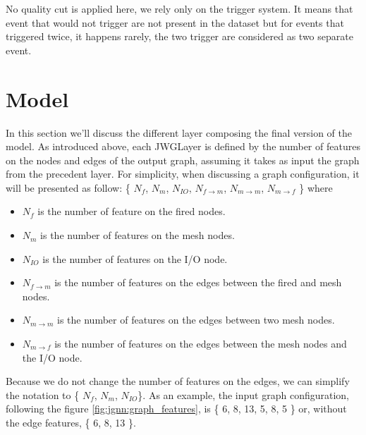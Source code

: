 \documentclass[../main.tex]{subfiles}
\begin{document}
No quality cut is applied here, we rely only on the trigger system. It means that event that would not trigger are not present in the dataset but for events that triggered twice, it happens rarely, the two trigger are considered as two separate event.



\section{Model}

In this section we'll discuss the different layer composing the final version of the model. As introduced above, each JWGLayer is defined by the number of features on the nodes and edges of the output graph, assuming it takes as input the graph from the precedent layer. For simplicity, when discussing a graph configuration, it will be presented as follow: \{ {\color{red} $N_{f}$},  {\color{Dandelion} $N_{m}$}, {\color{blue} $N_{IO}$}, $N_{f\rightarrow m}$, $N_{m \rightarrow m}$, $N_{m \rightarrow f}$ \} where
\begin{itemize}
  \item {\color{red} $N_{f}$} is the number of feature on the fired nodes.
  \item {\color{Dandelion} $N_{m}$} is the number of features on the mesh nodes.
  \item {\color{blue} $N_{IO}$} is the number of features on the I/O node.
  \item $N_{f\rightarrow m}$ is the number of features on the edges between the fired and mesh nodes.
  \item $N_{m \rightarrow m}$ is the number of features on the edges between two mesh nodes.
  \item $N_{m \rightarrow f}$ is the number of features on the edges between the mesh nodes and the I/O node.
\end{itemize}

Because we do not change the number of features on the edges, we can simplify the notation to \{{\color{red} $N_{f}$}, {\color{Dandelion} $N_{m}$}, {\color{blue} $N_{IO}$}\}. As an example, the input graph configuration, following the figure \ref{fig:jgnn:graph_features}, is \{{\color{red} 6}, {\color{Dandelion} 8}, {\color{blue} 13}, 5, 8, 5 \} or, without the edge features, \{{\color{red} 6}, {\color{Dandelion} 8}, {\color{blue} 13} \}.
\end{document}
